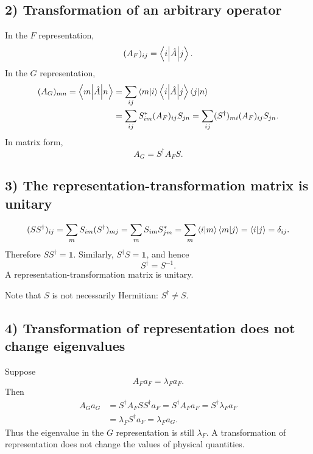 \subsection*{2) Transformation of an arbitrary operator}
In the $F$ representation,
\begin{equation}
(A_F)_{ij}=\left\langle i\middle|\hat{A}\middle|j\right\rangle.
\end{equation}
In the $G$ representation,
\begin{equation}\begin{aligned}
(A_G)_{mn}=\left\langle m\middle|\hat{A}\middle|n\right\rangle
&=\sum_{ij}\left\langle m\middle|i\right\rangle\left\langle i\middle|\hat{A}\middle|j\right\rangle\left\langle j\middle|n\right\rangle\\
&=\sum_{ij}S_{im}^*(A_F)_{ij}S_{jn}
=\sum_{ij}(S^\dagger)_{mi}(A_F)_{ij}S_{jn}.
\end{aligned}\end{equation}
In matrix form,
\begin{equation}
\boxed{A_G=S^\dagger A_F S.}
\end{equation}
\subsection*{3) The representation-transformation matrix is unitary}
\begin{equation}
(SS^\dagger)_{ij}=\sum_m S_{im}(S^\dagger)_{mj}
=\sum_m S_{im}S_{jm}^*
=\sum_m\left\langle i\middle|m\right\rangle\left\langle m\middle|j\right\rangle
=\left\langle i\middle|j\right\rangle=\delta_{ij}.
\end{equation}
Therefore $SS^\dagger=\mathbf1$. Similarly, $S^\dagger S=\mathbf1$, and hence
\begin{equation}
\boxed{S^\dagger=S^{-1}.}
\end{equation}
A representation-transformation matrix is unitary.

Note that $S$ is not necessarily Hermitian: $S^\dagger\ne S$.
\subsection*{4) Transformation of representation does not change eigenvalues}
Suppose
\begin{equation}
A_F a_F=\lambda_F a_F.
\end{equation}
Then
\begin{equation}\begin{aligned}
A_G a_G
&=S^\dagger A_F SS^\dagger a_F
=S^\dagger A_Fa_F=S^\dagger\lambda_Fa_F\\
&=\lambda_F S^\dagger a_F=\lambda_F a_G.
\end{aligned}\end{equation}
Thus the eigenvalue in the $G$ representation is still $\lambda_F$. A transformation of representation does not change the values of physical quantities.

